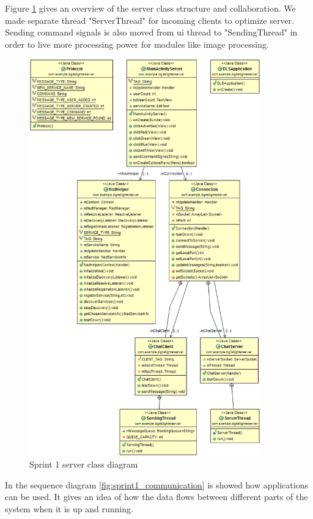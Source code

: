 Figure \ref{fig:class_diagram_server} gives an overview of the server class structure and collaboration. We made separate thread "ServerThread" for incoming clients to optimize server. Sending command signals is also moved from ui thread to "SendingThread" in order to live more processing power for modules like image processing.

\begin{figure}[H]
	\centering
		\includegraphics[width=10cm]{sprint1/class_diagram_server.png}
	\caption{Sprint 1 server class diagram}
	\label{fig:class_diagram_server}
\end{figure}

In the sequence diagram \ref{fig:sprint1_communication} is showed how applications can be used. It gives an idea of how the data flows between different parts of the system when it is up and running.

